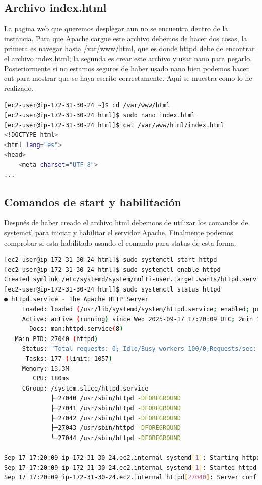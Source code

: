 \documentclass{article}
\begin{document}
\subsection{Archivo index.html}

	La pagina web que queremos desplegar aun no se encuentra dentro de la instancia. Para que Apache cargue este archivo debemos de hacer dos cosas, la primera es navegar hasta /var/www/html, que es donde httpd debe de encontrar el archivo index.html; la segunda es crear este archivo y usar nano para pegarlo. Posteriormente si no estamos seguros de haber usado nano bien podemos hacer cut para mostrar que se haya escrito correctamente. Aquí se muestra como lo he realizado.


\begin{lstlisting}[style=consola, language=bash, caption={Terminal, index.html}]
[ec2-user@ip-172-31-30-24 ~]$ cd /var/www/html
[ec2-user@ip-172-31-30-24 html]$ sudo nano index.html
[ec2-user@ip-172-31-30-24 html]$ cat /var/www/html/index.html
<!DOCTYPE html>
<html lang="es">
<head>
    <meta charset="UTF-8">
...
\end{lstlisting}
\newpage
\subsection{Comandos de start y habilitación}

	Después de haber creado el archivo html debemoos de utilizar los comandos de systemctl para iniciar y habilitar el servidor Apache. Finalmente podemos comprobar si esta habilitado usando el comando para status de esta forma. 

\begin{lstlisting}[style=consola, language=bash, caption={Terminal, systemctl}]
[ec2-user@ip-172-31-30-24 html]$ sudo systemctl start httpd
[ec2-user@ip-172-31-30-24 html]$ sudo systemctl enable httpd
Created symlink /etc/systemd/system/multi-user.target.wants/httpd.service → /usr/lib/systemd/system/httpd.service.
[ec2-user@ip-172-31-30-24 html]$ sudo systemctl status httpd
● httpd.service - The Apache HTTP Server
     Loaded: loaded (/usr/lib/systemd/system/httpd.service; enabled; preset: disabled)
     Active: active (running) since Wed 2025-09-17 17:20:09 UTC; 2min 11s ago
       Docs: man:httpd.service(8)
   Main PID: 27040 (httpd)
     Status: "Total requests: 0; Idle/Busy workers 100/0;Requests/sec: 0; Bytes served/sec:   0 B/sec"
      Tasks: 177 (limit: 1057)
     Memory: 13.3M
        CPU: 180ms
     CGroup: /system.slice/httpd.service
             ├─27040 /usr/sbin/httpd -DFOREGROUND
             ├─27041 /usr/sbin/httpd -DFOREGROUND
             ├─27042 /usr/sbin/httpd -DFOREGROUND
             ├─27043 /usr/sbin/httpd -DFOREGROUND
             └─27044 /usr/sbin/httpd -DFOREGROUND

Sep 17 17:20:09 ip-172-31-30-24.ec2.internal systemd[1]: Starting httpd.service - The Apache HTTP Server...
Sep 17 17:20:09 ip-172-31-30-24.ec2.internal systemd[1]: Started httpd.service - The Apache HTTP Server.
Sep 17 17:20:09 ip-172-31-30-24.ec2.internal httpd[27040]: Server configured, listening on: port 80
\end{lstlisting}
\end{document}
